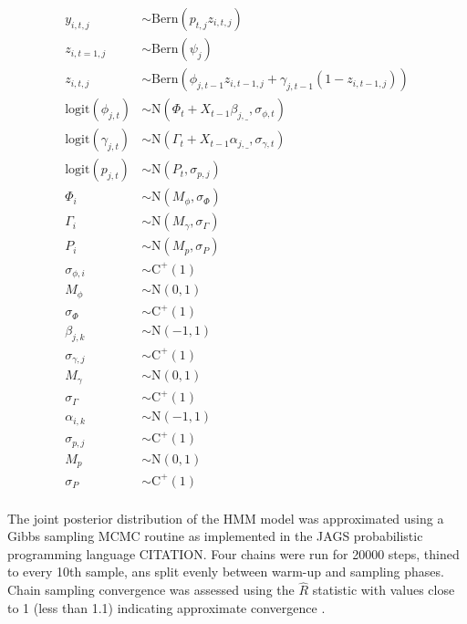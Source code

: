 \documentclass[12pt,letterpaper]{article}
\begin{document}
\begin{equation}
  \begin{aligned}
    y_{i, t, j} &\sim \mathrm{Bern}(p_{t, j} z_{i, t, j}) \\
    z_{i, t = 1, j} &\sim \mathrm{Bern}(\psi_{j}) \\
    z_{i, t, j} &\sim \mathrm{Bern}(\phi_{j, t - 1} z_{i, t - 1, j} + \gamma_{j, t - 1} (1 - z_{i, t - 1, j})) \\
    \mathrm{logit}(\phi_{j, t}) &\sim \mathrm{N}(\Phi_{t} + X_{t - 1}\beta_{j, \_}, \sigma_{\phi, t}) \\
    \mathrm{logit}(\gamma_{j, t}) &\sim \mathrm{N}(\Gamma_{t} + X_{t - 1}\alpha_{j, \_}, \sigma_{\gamma, t}) \\
    \mathrm{logit}(p_{j, t}) &\sim \mathrm{N}(P_{t}, \sigma_{p, j}) \\
    \Phi_{i} &\sim \mathrm{N}(M_{\phi}, \sigma_{\Phi}) \\
    \Gamma_{i} &\sim \mathrm{N}(M_{\gamma}, \sigma_{\Gamma}) \\
    P_{i} &\sim \mathrm{N}(M_{p}, \sigma_{P}) \\
    \sigma_{\phi, i} &\sim \mathrm{C}^{+}(1) \\
    M_{\phi} &\sim \mathrm{N}(0, 1) \\
    \sigma_{\Phi} &\sim \mathrm{C}^{+}(1) \\
    \beta_{j, k} &\sim \mathrm{N}(-1, 1) \\
    \sigma_{\gamma, j} &\sim \mathrm{C}^{+}(1) \\
    M_{\gamma} &\sim \mathrm{N}(0, 1) \\
    \sigma_{\Gamma} &\sim \mathrm{C}^{+}(1) \\
    \alpha_{i, k} &\sim \mathrm{N}(-1, 1) \\
    \sigma_{p, j} &\sim \mathrm{C}^{+}(1) \\
    M_{p} &\sim \mathrm{N}(0, 1) \\
    \sigma_{P} &\sim \mathrm{C}^{+}(1) \\
  \end{aligned}
\end{equation}


The joint posterior distribution of the HMM model was approximated using a Gibbs sampling MCMC routine as implemented in the JAGS probabilistic programming language CITATION. Four chains were run for 20000 steps, thined to every 10th sample, ans split evenly between warm-up and sampling phases. Chain sampling convergence was assessed using the \(\hat{R}\) statistic with values close to 1 (less than 1.1) indicating approximate convergence \citep{Gelman2013d}.
\end{document}
